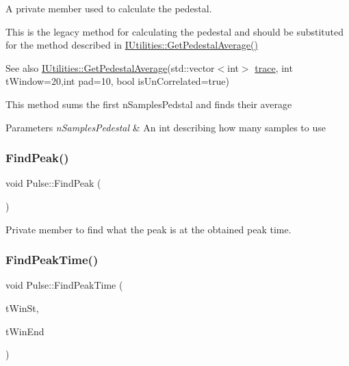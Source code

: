 A private member used to calculate the pedestal. 

This is the legacy method for calculating the pedestal and should be substituted for the method described in \hyperlink{classIUtilities_a65527a73c39d6cae81f6a09fb9a44d93}{I\+Utilities\+::\+Get\+Pedestal\+Average()}

\begin{DoxySeeAlso}{See also}
\hyperlink{classIUtilities_a65527a73c39d6cae81f6a09fb9a44d93}{I\+Utilities\+::\+Get\+Pedestal\+Average}(std\+::vector$<$int$>$ \hyperlink{classPulse_a06b5a0a179c529bb8d6447ba2dd24917}{trace}, int t\+Window=20,int pad=10, bool is\+Un\+Correlated=true)
\end{DoxySeeAlso}
This method sums the first n\+Samples\+Pedstal and finds their average


\begin{DoxyParams}{Parameters}
{\em n\+Samples\+Pedestal} & An int describing how many samples to use \\
\hline
\end{DoxyParams}
\mbox{\label{classPulse_a09a13c062dc658a32a621ae72625676a}} 
\subsubsection{\texorpdfstring{Find\+Peak()}{FindPeak()}}
{\footnotesize\ttfamily void Pulse\+::\+Find\+Peak (\begin{DoxyParamCaption}{ }\end{DoxyParamCaption})\hspace{0.3cm}{\ttfamily [private]}}



Private member to find what the peak is at the obtained peak time. 

\mbox{\label{classPulse_a6465dc326f636cfdfeb0271899b4f350}} 
\subsubsection{\texorpdfstring{Find\+Peak\+Time()}{FindPeakTime()}}
{\footnotesize\ttfamily void Pulse\+::\+Find\+Peak\+Time (\begin{DoxyParamCaption}\item[{Int\+\_\+t}]{t\+Win\+St,  }\item[{Int\+\_\+t}]{t\+Win\+End }\end{DoxyParamCaption})\hspace{0.3cm}{\ttfamily [private]}}



